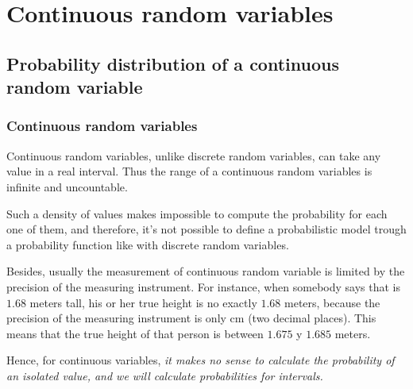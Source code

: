 \section{Continuous random variables}



\subsection{Probability distribution of a continuous random variable}

\begin{frame}
\frametitle{Continuous random variables}
Continuous random variables, unlike discrete random variables, can take any value in a real interval. 
Thus the range of a continuous random variables is infinite and uncountable. 

Such a density of values makes impossible to compute the probability for each one of them, and therefore, it's not possible to define a probabilistic model trough a probability function like with discrete random variables.

Besides, usually the measurement of continuous random variable is limited by the precision of the measuring instrument.
For instance, when somebody says that is $1.68$ meters tall, his or her true height is no exactly $1.68$ meters, because the precision of the measuring instrument is only cm (two decimal places). 
This means that the true height of that person is between $1.675$ y $1.685$ meters.

Hence, for continuous variables, \alert{\emph{it makes no sense to calculate the probability of an isolated value, and we
will calculate probabilities for intervals.}}
\end{frame}


